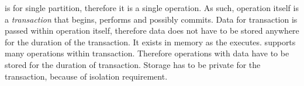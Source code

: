 \lwt is for single partition, therefore it is a single operation. As such, operation itself is a \emph{transaction} that begins, performs and possibly commits. Data for \lwt transaction is passed within operation itself, therefore data does not have to be stored anywhere for the duration of the transaction. It exists in memory as the \lwt executes.
\mpt supports many operations within transaction. Therefore operations with data have to be stored for the duration of transaction. Storage has to be private for the transaction, because of isolation requirement.









